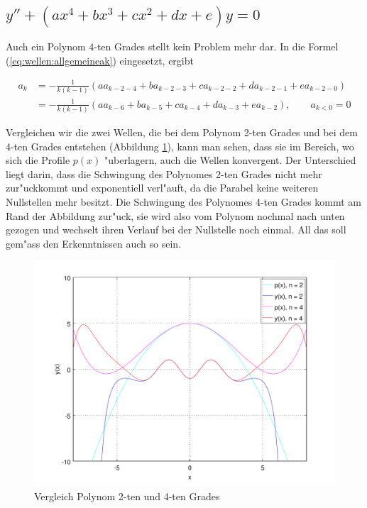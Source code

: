\subsection{\texorpdfstring{$y''+(ax^4+bx^3+cx^2+dx+e)y = 
0$}{y''-(ax4+bx3+cx2+dx+e)y = 0}}

Auch ein Polynom $4$-ten Grades stellt kein Problem mehr dar. In die 
Formel (\ref{eq:wellen:allgemeineak}) eingesetzt, ergibt

\begin{equation*}
	\begin{split}
		a_k &= -\frac{1}{k(k-1)} (aa_{k-2-4} + 
		ba_{k-2-3} + ca_{k-2-2} + da_{k-2-1} +ea_{k-2-0})
		\\
		&= -\frac{1}{k(k-1)} (aa_{k-6} + ba_{k-5} + 
		ca_{k-4} + da_{k-3} +ea_{k-2}), \qquad a_{k<0} = 0
	\end{split}
\end{equation*}

Vergleichen wir die zwei Wellen, die bei dem Polynom 2-ten Grades und bei dem 
4-ten Grades entstehen (Abbildung \ref{fig:wellen:poly4-dgl}), kann man sehen, 
dass sie im Bereich, wo sich die Profile $p(x)$ "uberlagern, auch die Wellen 
konvergent. Der Unterschied liegt darin, dass die Schwingung des Polynomes 
2-ten Grades nicht mehr zur"uckkommt und exponentiell verl"auft, da die Parabel 
keine weiteren Nullstellen mehr besitzt. Die Schwingung des Polynomes 4-ten 
Grades kommt am Rand der Abbildung zur"uck, sie wird also vom Polynom nochmal 
nach unten gezogen und wechselt ihren Verlauf bei der Nullstelle noch einmal. 
All das soll gem"ass den Erkenntnissen auch so sein. 


\begin{figure}
	\includegraphics[scale=0.65]{./wellen/images/allgemein/n4.pdf}
	\caption{Vergleich Polynom 2-ten und 4-ten Grades}
	\label{fig:wellen:poly4-dgl}
\end{figure}